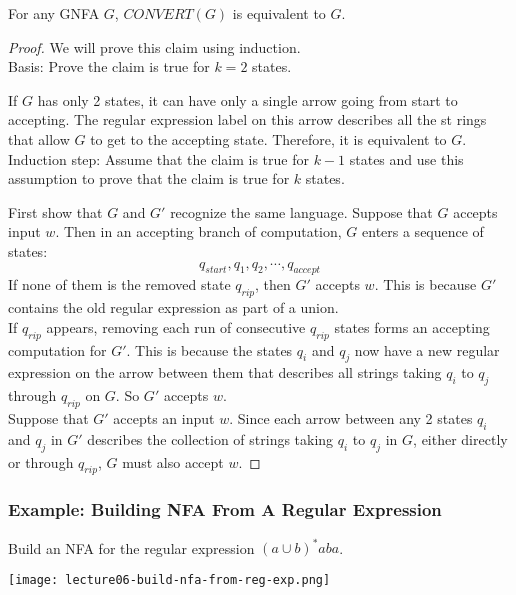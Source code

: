 \documentclass[11pt,a4paper]{article}
\begin{document}
\begin{claim}
    For any GNFA $G$, $CONVERT(G)$ is equivalent to $G$. \\

    \begin{proof}
        We will prove this claim using induction. \\

        Basis: Prove the claim is true for $k=2$ states.

        If $G$ has only 2 states, it can have only a single arrow going from start to accepting.
        The regular expression label on this arrow describes all the st rings that allow $G$ to get to the accepting state.
        Therefore, it is equivalent to $G$. \\

        Induction step: Assume that the claim is true for $k-1$ states and use this assumption to prove that the claim is true for $k$ states.

        First show that $G$ and $G'$ recognize the same language. Suppose that $G$ accepts input $w$. Then in an accepting branch of computation, $G$ enters a sequence of states: $$q_{start},q_1,q_2,\cdots,q_{accept}$$
        If none of them is the removed state $q_{rip}$, then $G'$ accepts $w$. This is because $G'$ contains the old regular expression as part of a union. \\

        If $q_{rip}$ appears, removing each run of consecutive $q_{rip}$ states forms an accepting computation for $G'$.
        This is because the states $q_i$ and $q_j$ now have a new regular expression on the arrow between them that describes all strings taking $q_i$ to $q_j$ through $q_{rip}$ on $G$. So $G'$ accepts $w$. \\

        Suppose that $G'$ accepts an input $w$. Since each arrow between any 2 states $q_i$ and $q_j$ in $G'$ describes the collection of strings taking $q_i$ to $q_j$ in $G$, either directly or through $q_{rip}$, $G$ must also accept $w$.
    \end{proof}
\end{claim}

\subsubsection{Example: Building NFA From A Regular Expression}
\begin{example}
    Build an NFA for the regular expression $(a\cup b)^*aba$.

    \texttt{[image: lecture06-build-nfa-from-reg-exp.png]}
\end{example}
\end{document}
